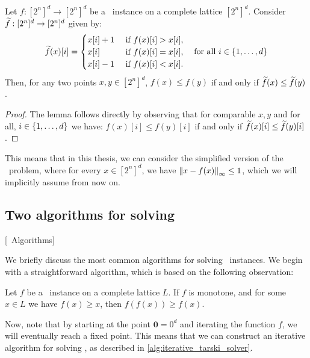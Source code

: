 \begin{lemma}
	Let $f : [2^n]^d \rightarrow [2^n]^d$ be a \Tarski\ instance on a complete lattice $[2^n]^d$. Consider $\widetilde{f} : [2^n]^d \rightarrow [2^n]^d$ given by: 
	\begin{align*}
		\widetilde{f}(x)[i] = \begin{cases}
			                x[i] + 1 & \text{ if } f(x)[i] > x[i], \\
			                x[i]     & \text{ if } f(x)[i] = x[i], \\
			                x[i] - 1 & \text{ if } f(x)[i] < x[i].
		                \end{cases} \quad \text{for all $i \in \left\{1, \dots, d\right\}$}
	\end{align*}
	Then, for any two points $x, y \in [2^n]^d$, $f(x) \leq f(y)$ if and only if $\widetilde{f}(x) \leq \widetilde{f}(y)$.
\end{lemma}
\begin{proof}
	The lemma follows directly by observing that for comparable $x, y$ and for all, $i \in \left\{1, \dots, d\right\}$ we have: $f(x)[i] \leq f(y)[i]$ if and only if $\widetilde{f}(x)[i] \leq \widetilde{f}(y)[i]$.
\end{proof}
This means that in this thesis, we can consider the simplified version of the \Tarski\ problem, where for every $x \in [2^n]^d$, we have $\left\lVert x - f(x)\right\rVert_{\infty} \leq 1$, which we will implicitly assume from now on.

\subsection{Two algorithms for solving \Tarski}[\Tarski\ Algorithms]
\label{sec:tarski_algorithms}

We briefly discuss the most common algorithms for solving \Tarski\ instances. We begin with a straightforward algorithm, which is based on the following observation:
\begin{remark}
	Let $f$ be a \Tarski\ instance on a complete lattice $L$. If $f$ is monotone, and for some $x \in L$ we have $f(x) \geq x$, then $f(f(x)) \geq f(x)$.
\end{remark}
Now, note that by starting at the point $\mathbf{0} = 0^d$ and iterating the function $f$, we will eventually reach a fixed point. This means that we can construct an iterative algorithm for solving \Tarski, as described in \cref{alg:iterative_tarski_solver}.

